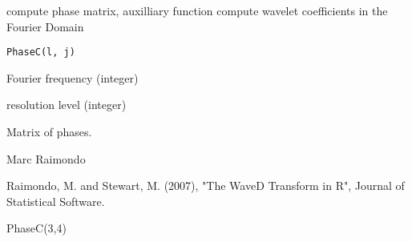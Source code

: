 \begin{Description}\relax
compute phase matrix, auxilliary function compute wavelet coefficients
in the Fourier Domain
\end{Description}
\begin{Usage}
\begin{verbatim}
PhaseC(l, j)
\end{verbatim}
\end{Usage}
\begin{Arguments}
\begin{ldescription}
\item[\code{l}] Fourier frequency (integer) 
\item[\code{j}] resolution level (integer) 
\end{ldescription}
\end{Arguments}
\begin{Value}
Matrix of phases.
\end{Value}
\begin{Author}\relax
Marc Raimondo
\end{Author}
\begin{References}\relax
Raimondo, M. and Stewart, M. (2007),
"The WaveD Transform in R", Journal of Statistical Software.
\end{References}
\begin{SeeAlso}\relax
{}
\end{SeeAlso}
\begin{Examples}
\begin{ExampleCode}
PhaseC(3,4)
\end{ExampleCode}
\end{Examples}

